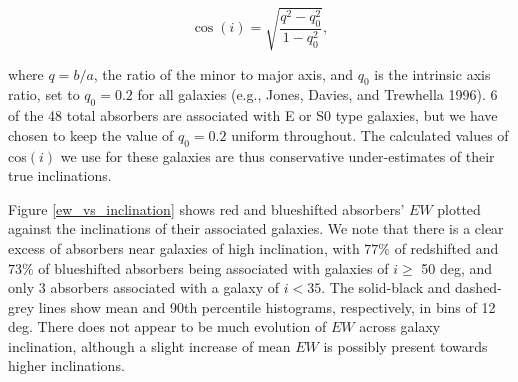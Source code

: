 \documentclass[iop]{emulateapj-rtx4}
\begin{document}
\begin{equation}
	\cos(i) = \sqrt{\frac{q^2 - q_0^2}{1 - q_0^2}},
	\label{incEq}
\end{equation}

\noindent where $q = b/a$, the ratio of the minor to major axis, and $q_0$ is the intrinsic axis ratio, set to $q_0 = 0.2$ for all galaxies (e.g., Jones, Davies, and Trewhella 1996). 6 of the 48 total absorbers are associated with E or S0 type galaxies, but we have chosen to keep the value of $q_0 = 0.2$ uniform throughout. The calculated values of cos$(i)$ we use for these galaxies are thus conservative under-estimates of their true inclinations.



Figure \ref{ew_vs_inclination} shows red and blueshifted absorbers' $EW$ plotted against the inclinations of their associated galaxies. We note that there is a clear excess of absorbers near galaxies of high inclination, with $77\%$ of redshifted and $73\%$ of blueshifted absorbers being associated with galaxies of $i \geq$ 50 deg, and only 3 absorbers associated with a galaxy of $i<35$. The solid-black and dashed-grey lines show mean and 90th percentile histograms, respectively, in bins of 12 deg. There does not appear to be much evolution of $EW$ across galaxy inclination, although a slight increase of mean $EW$ is possibly present towards higher inclinations.
\end{document}
